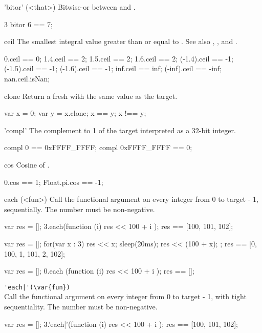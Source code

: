 \begin{urbiscriptapi}
\item['bitor'](<that>)%
  Bitwise-or between \this and .
\begin{urbiassert}
3 bitor 6 == 7;
\end{urbiassert}

\item[ceil] The smallest integral value greater than or equal to \this.  See
  also , , and .
\begin{urbiassert}
     0.ceil ==  0;
   1.4.ceil ==  2;     1.5.ceil ==  2;    1.6.ceil ==  2;
(-1.4).ceil == -1;  (-1.5).ceil == -1; (-1.6).ceil == -1;
   inf.ceil == inf; (-inf).ceil == -inf;
   nan.ceil.isNan;
\end{urbiassert}

\item[clone]
  Return a fresh  with the same value as the target.
\begin{urbiassert}
var x = 0;
var y = x.clone;
x == y;  x !== y;
\end{urbiassert}

\item['compl']
  The complement to 1 of the target interpreted as a 32-bit integer.
\begin{urbiassert}
compl 0 == 0xFFFF_FFFF;    compl 0xFFFF_FFFF == 0;
\end{urbiassert}

\item[cos]
  Cosine of \this.
\begin{urbiassert}
0.cos == 1;   Float.pi.cos == -1;
\end{urbiassert}

\item[each](<fun>)%
  Call the functional argument  on every integer from 0 to
  target - 1, sequentially.  The number must be non-negative.
\begin{urbiassert}
{
  var res = [];
  3.each(function (i) { res << 100 + i });
  res
}
== [100, 101, 102];

{
  var res = [];
  for(var x : 3) { res << x; sleep(20ms); res << (100 + x); };
  res
}
== [0, 100, 1, 101, 2, 102];

{
  var res = [];
  0.each (function (i) { res << 100 + i });
  res
}
== [];
\end{urbiassert}

\item \lstinline='each|'(\var{fun})=\\%
  Call the functional argument  on every integer from 0 to
  target - 1, with tight sequentiality.  The number must be
  non-negative.
\begin{urbiassert}
{
  var res = [];
  3.'each|'(function (i) { res << 100 + i });
  res
}
== [100, 101, 102];


\end{urbiassert}
\end{urbiscriptapi}
